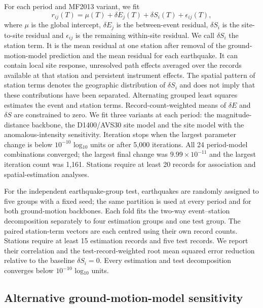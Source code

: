 \documentclass[11pt]{article}
\begin{document}
For each period and MF2013 variant, we fit
\begin{equation}
r_{ij}(T)=\mu(T)+\delta E_j(T)+\delta S_i(T)+\epsilon_{ij}(T),
\end{equation}
where $\mu$ is the global intercept, $\delta E_j$ is the between-event residual, $\delta S_i$ is the site-to-site residual and $\epsilon_{ij}$ is the remaining within-site residual. We call $\delta S_i$ the station term. It is the mean residual at one station after removal of the ground-motion-model prediction and the mean residual for each earthquake. It can contain local site response, unresolved path effects averaged over the records available at that station and persistent instrument effects. The spatial pattern of station terms denotes the geographic distribution of $\delta S_i$ and does not imply that these contributions have been separated. Alternating grouped least squares estimates the event and station terms. Record-count-weighted means of $\delta E$ and $\delta S$ are constrained to zero. We fit three variants at each period: the magnitude-distance backbone, the D1400/AVS30 site model and the site model with the anomalous-intensity sensitivity. Iteration stops when the largest parameter change is below $10^{-10}$ log$_{10}$ units or after 5,000 iterations. All 24 period-model combinations converged; the largest final change was $9.99\times10^{-11}$ and the largest iteration count was 1,161. Stations require at least 20 records for association and spatial-estimation analyses.

For the independent earthquake-group test, earthquakes are randomly assigned to five groups with a fixed seed; the same partition is used at every period and for both ground-motion backbones. Each fold fits the two-way event--station decomposition separately to four estimation groups and one test group. The paired station-term vectors are each centred using their own record counts. Stations require at least 15 estimation records and five test records. We report their correlation and the test-record-weighted root mean squared error reduction relative to the baseline $\delta S_i=0$. Every estimation and test decomposition converges below $10^{-10}$ log$_{10}$ units.

\subsection{Alternative ground-motion-model sensitivity}
\end{document}
